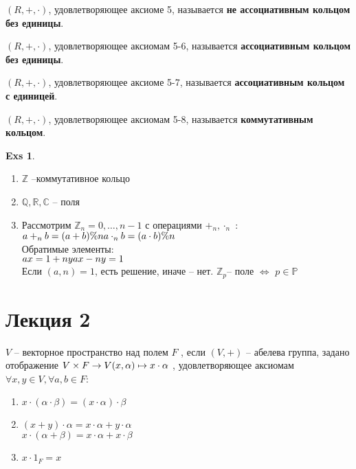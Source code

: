 \documentclass[11pt]{book}
\theoremstyle{definition}
\theoremstyle{plain}
\theoremstyle{plain}
\theoremstyle{definition}
\newtheorem*{exs}{Exs}
\theoremstyle{remark}
\begin{document}
\begin{defn}
$(R, +, \cdot)$, удовлетворяющее аксиоме 5, называется {\bf не ассоциативным кольцом без единицы}.
\end{defn}

\begin{defn}
$(R, +, \cdot)$, удовлетворяющее аксиомам 5-6, называется {\bf ассоциативным кольцом без единицы}.
\end{defn}

\begin{defn}
$(R, +, \cdot)$, удовлетворяющее аксиоме 5-7, называется {\bf ассоциативным кольцом с единицей}.
\end{defn}

\begin{defn}
$(R, +, \cdot)$, удовлетворяющее аксиомам 5-8, называется {\bf коммутативным кольцом}.
\end{defn}

\begin{exs}$ $
\begin{enumerate}
    \item $\mathbb Z$ --коммутативное кольцо
    \item $\mathbb {Q, R, C}$ -- поля
    \item Рассмотрим $\mathbb Z_n = {0, \ldots, n-1}$ с операциями $+_n, \cdot_n$ :\\
	$a +_n b = (a + b) \% n \\
	a \cdot_n b = (a \cdot b) \% n$\\
	Обратимые элементы:\\
	$ax = 1 + ny \\
	ax - ny = 1$\\
	Если $(a, n) = 1$, есть решение, иначе -- нет.
	$\mathbb Z_p $-- поле $\Leftrightarrow$ $ p \in \mathbb P$
\end{enumerate}
\end{exs}

  \section{Лекция 2} 
\begin{defn}
$V$ -- векторное пространство над полем $F$ , если $(V, +)$ -- абелева группа, задано отображение $V\times F \to V \\ (x, \alpha) \mapsto x \cdot \alpha $ , удовлетворяющее аксиомам $\forall x, y \in V, \forall a, b \in F$:
\begin{enumerate}
    \setcounter{enumi}{+4}
    \item $x \cdot (\alpha \cdot \beta) = (x \cdot \alpha) \cdot \beta$
    \item$ (x + y) \cdot \alpha = x \cdot \alpha + y \cdot \alpha$\\
     $x \cdot (\alpha + \beta) = x \cdot \alpha + x \cdot \beta$
    \item $x \cdot 1_F = x$
\end{enumerate}
\end{defn}
\end{document}
